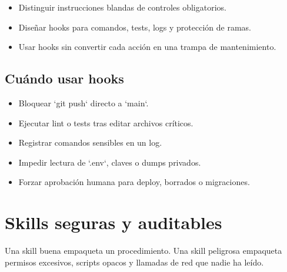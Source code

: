 \documentclass[11pt,a4paper]{book}
\begin{document}
\begin{itemize}\item Distinguir instrucciones blandas de controles obligatorios.\end{itemize}
\begin{itemize}\item Diseñar hooks para comandos, tests, logs y protección de ramas.\end{itemize}
\begin{itemize}\item Usar hooks sin convertir cada acción en una trampa de mantenimiento.\end{itemize}
\section{Cuándo usar hooks}
\begin{itemize}\item Bloquear `git push` directo a `main`.\end{itemize}
\begin{itemize}\item Ejecutar lint o tests tras editar archivos críticos.\end{itemize}
\begin{itemize}\item Registrar comandos sensibles en un log.\end{itemize}
\begin{itemize}\item Impedir lectura de `.env`, claves o dumps privados.\end{itemize}
\begin{itemize}\item Forzar aprobación humana para deploy, borrados o migraciones.\end{itemize}
\chapter{Skills seguras y auditables}
Una skill buena empaqueta un procedimiento. Una skill peligrosa empaqueta permisos excesivos, scripts opacos y llamadas de red que nadie ha leído.
\end{document}
